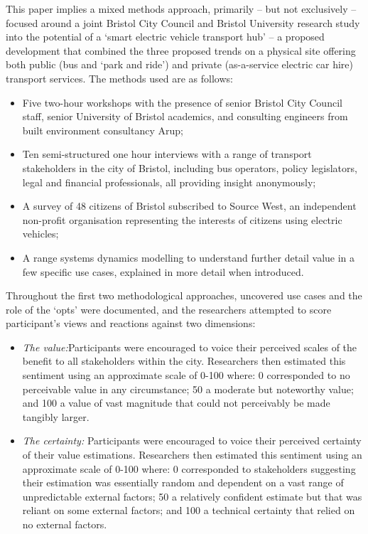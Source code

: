 \documentclass[b5paper,10pt]{article}
\begin{document}
This paper implies a mixed methods approach, primarily – but not
exclusively -- focused around a joint Bristol City Council and Bristol
University research study into the potential of a `smart electric
vehicle transport hub' -- a proposed development that combined the
three proposed trends on a physical site offering both public (bus and
`park and ride') and private (as-a-service electric car hire)
transport services. The methods used are as follows:

\begin{itemize}
\item Five two-hour workshops with the presence of senior Bristol City
Council staff, senior University of Bristol academics, and consulting
engineers from built environment consultancy Arup;
\item Ten semi-structured one hour interviews with a range of
transport stakeholders in the city of Bristol, including bus
operators, policy legislators, legal and financial professionals, all
providing insight anonymously;
\item A survey of 48 citizens of Bristol subscribed to Source West, an
independent non-profit organisation representing the interests of
citizens using electric vehicles;
\item A range systems dynamics modelling to understand further detail
  value in a few specific use cases, explained in more detail when
  introduced.
\end{itemize}

Throughout the first two methodological approaches, uncovered use
cases and the role of the `opts' were documented, and the researchers
attempted to score participant's views and reactions against two
dimensions:

\begin{itemize}
\item {\emph{The value:}}Participants were encouraged to voice their
perceived scales of the benefit to all stakeholders within the
city. Researchers then estimated this sentiment using an approximate
scale of 0-100 where: 0 corresponded to no perceivable value in any
circumstance; 50 a moderate but noteworthy value; and 100 a value of
vast magnitude that could not perceivably be made tangibly larger.
\item {\emph{The certainty:}} Participants were encouraged to voice
their perceived certainty of their value estimations. Researchers then
estimated this sentiment using an approximate scale of 0-100 where: 0
corresponded to stakeholders suggesting their estimation was
essentially random and dependent on a vast range of unpredictable
external factors; 50 a relatively confident estimate but that was
reliant on some external factors; and 100 a technical certainty that
relied on no external factors.
\end{itemize}
\end{document}
